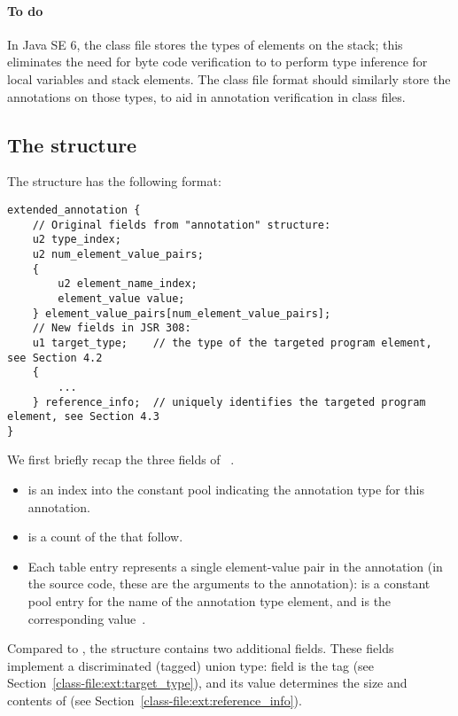\documentclass[10pt]{article}
\begin{document}
\paragraph{To do}
In Java SE 6, the class file stores the types of elements on the stack;
this eliminates the need for byte code verification to to perform type
inference for local variables and stack elements.  The class file format
should similarly store the annotations on those types, to aid in annotation
verification in class files.


\subsection{The  structure\label{class-file:ext}}

The \extendedannotation structure has the following format:

\begin{Verbatim}
extended_annotation {
    // Original fields from "annotation" structure:
    u2 type_index;
    u2 num_element_value_pairs;
    {
        u2 element_name_index;
        element_value value;
    } element_value_pairs[num_element_value_pairs];
    // New fields in JSR 308:
    u1 target_type;    // the type of the targeted program element, see Section 4.2
    {
        ...
    } reference_info;  // uniquely identifies the targeted program element, see Section 4.3
}
\end{Verbatim}

We first briefly recap
the three fields of ~\cite[\S 4.8.15]{LindholmY99:CFF5}.

\begin{itemize}
\item {} is an index into the constant pool indicating the
  annotation type for this annotation.
\item {} is a count of the
   that follow.
\item Each  table entry represents a single
  element-value pair in the annotation (in the source code, these are the
  arguments to the annotation):   is a
  constant pool entry for the name of the annotation type element, and
   is the corresponding value~\cite[\S 4.8.15.1]{LindholmY99:CFF5}.
\end{itemize}

Compared to ,
the \extendedannotation structure contains two additional fields.
These fields implement a discriminated (tagged) union type:
field  is the tag (see
Section~\ref{class-file:ext:target_type}), and its value determines the
size and
contents of  (see Section~\ref{class-file:ext:reference_info}).
\end{document}
